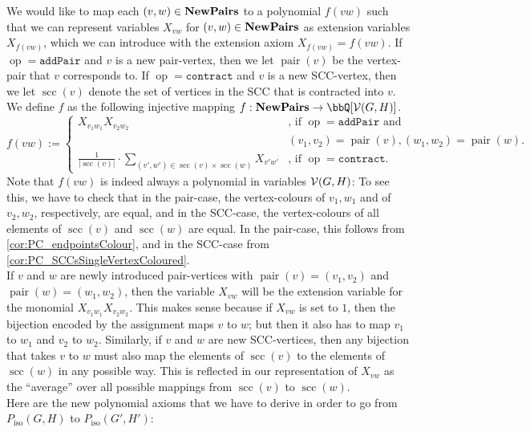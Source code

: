 \documentclass[a4paper,UKenglish,cleveref, autoref, thm-restate]{lipics-v2021}
\newcommand{\Pairs}{\text{\upshape \textbf{NewPairs}}}
\newcommand{\Vv}{{\cal V}}
\newcommand{\pairOp }{\texttt{addPair}}
\newcommand{\sccOp }{\texttt{contract}}
\newcommand{\op}{\operatorname{op}}
\newcommand{\scc}{{\operatorname{scc}}}
\newcommand{\pair}{{\operatorname{pair}}}
\newcommand{\Piso}{P_{\text{iso}}}
\begin{document}
	We would like to map each $(v,w) \in \Pairs$ to a polynomial $f(vw)$ such that we can represent variables $X_{vw}$ for $(v,w) \in \Pairs$ as extension variables $X_{f(vw)}$, which we can introduce with the extension axiom $X_{f(vw)} = f(vw)$. If $\op = \pairOp$ and $v$ is a new pair-vertex, then we let $\pair(v)$ be the vertex-pair that $v$ corresponds to. If $\op = \sccOp$ and $v$ is a new SCC-vertex, then we let $\scc(v)$ denote the set of vertices in the SCC that is contracted into $v$. We define $f$ as the following injective mapping $f : \Pairs \to \bbQ[\Vv(G,H)]$. 
	\begin{equation*}
		f(vw) := \begin{cases}
			X_{v_1w_1}X_{v_2w_2} & \text{, if } \op = \pairOp \text{ and }\\  & (v_1,v_2) = \pair(v), (w_1,w_2) = \pair(w). \\
			\frac{1}{|\scc(v)|} \cdot  \sum\limits_{(v',w')\in \scc(v) \times \scc(w)} X_{v'w'}& \text{, if } \op=\sccOp.
		\end{cases}
	\end{equation*} 
	Note that $f(vw)$ is indeed always a polynomial in variables $\Vv(G,H)$: To see this, we have to check that in the pair-case, the vertex-colours of $v_1,w_1$ and of $v_2, w_2$, respectively, are equal, and in the SCC-case, the vertex-colours of all elements of $\scc(v)$ and $\scc(w)$ are equal. In the pair-case, this follows from \autoref{cor:PC_endpointsColour}, and in the SCC-case from \autoref{cor:PC_SCCsSingleVertexColoured}.\\
	
	If $v$ and $w$ are newly introduced pair-vertices with $\pair(v) = (v_1,v_2)$ and $\pair(w) = (w_1,w_2)$, then the variable $X_{vw}$ will be the extension variable for the monomial $X_{v_1w_1}X_{v_2w_2}$. This makes sense because if $X_{vw}$ is set to $1$, then the bijection encoded by the assignment maps $v$ to $w$; but then it also has to map $v_1$ to $w_1$ and $v_2$ to $w_2$. Similarly, if $v$ and $w$ are new SCC-vertices, then any bijection that takes $v$ to $w$ must also map the elements of $\scc(v)$ to the elements of $\scc(w)$ in any possible way. This is reflected in our representation of $X_{vw}$ as the ``average'' over all possible mappings from $\scc(v)$ to $\scc(w)$.\\
	
	Here are the new polynomial axioms that we have to derive in order to go from $\Piso(G,H)$ to $\Piso(G',H')$:
	
\end{document}
